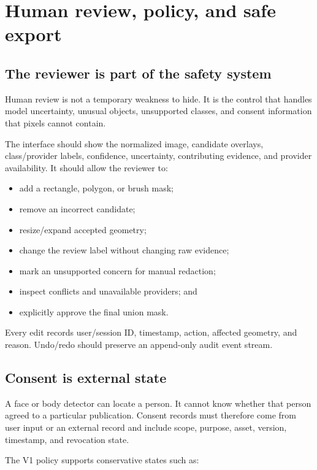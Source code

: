 \chapter{Human review, policy, and safe export}

\section{The reviewer is part of the safety system}

Human review is not a temporary weakness to hide. It is the control that handles model uncertainty, unusual objects, unsupported classes, and consent information that pixels cannot contain.

The interface should show the normalized image, candidate overlays, class/provider labels, confidence, uncertainty, contributing evidence, and provider availability. It should allow the reviewer to:

\begin{itemize}[leftmargin=6mm]
  \item add a rectangle, polygon, or brush mask;
  \item remove an incorrect candidate;
  \item resize/expand accepted geometry;
  \item change the review label without changing raw evidence;
  \item mark an unsupported concern for manual redaction;
  \item inspect conflicts and unavailable providers; and
  \item explicitly approve the final union mask.
\end{itemize}

Every edit records user/session ID, timestamp, action, affected geometry, and reason. Undo/redo should preserve an append-only audit event stream.

\section{Consent is external state}

A face or body detector can locate a person. It cannot know whether that person agreed to a particular publication. Consent records must therefore come from user input or an external record and include scope, purpose, asset, version, timestamp, and revocation state.

The V1 policy supports conservative states such as:

